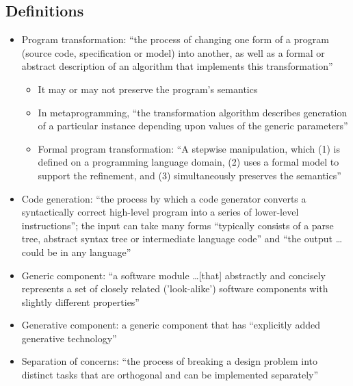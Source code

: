 \subsection{Definitions}
\begin{itemize}
      \item Program transformation: ``the process of changing one form of a
            program (source code, specification or model) into another, as well
            as a formal or abstract description of an algorithm that implements
            this transformation'' \citep[p.~18]{stuikys_taxonomy_2013}
            \begin{itemize}
                  \item It may or may not preserve the program's semantics
                        \citep[p.~18]{stuikys_taxonomy_2013}
                  \item In metaprogramming, ``the transformation algorithm
                        describes generation of a particular instance depending
                        upon values of the generic parameters''
                        \citep[p.~18]{stuikys_taxonomy_2013}
                  \item Formal program transformation: ``A stepwise
                        manipulation, which (1) is defined on a programming
                        language domain, (2) uses a formal model to support the
                        refinement, and (3) simultaneously preserves the
                        semantics'' \citep[p.~18]{stuikys_taxonomy_2013}
            \end{itemize}
      \item Code generation: ``the process by which a code generator converts a
            syntactically correct high-level program into a series of
            lower-level instructions''; the input can take many forms
            ``typically consists of a parse tree, abstract syntax tree or
            intermediate language code'' and ``the output \dots could be in any
            language'' \citep[p.~19]{stuikys_taxonomy_2013}
      \item Generic component: ``a software module \dots [that] abstractly and
            concisely represents a set of closely related ('look-alike')
            software components with slightly different properties''
            \citep[p.~19]{stuikys_taxonomy_2013}
      \item Generative component: a generic component that has ``explicitly
            added generative technology'' \citep[p.~24]{stuikys_taxonomy_2013}
      \item Separation of concerns: ``the process of breaking a design problem
            into distinct tasks that are orthogonal and can be implemented
            separately'' \citep[p.~21]{stuikys_taxonomy_2013}
\end{itemize}

